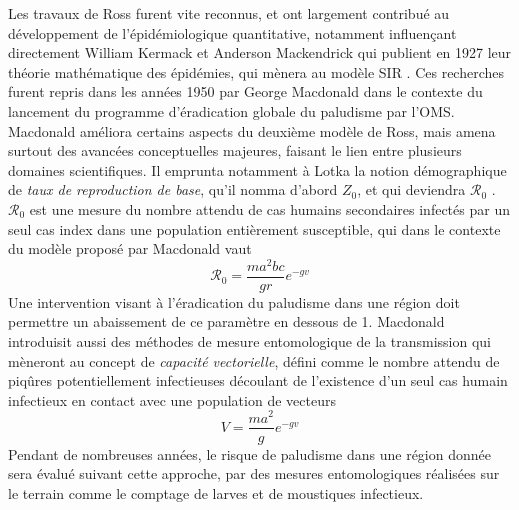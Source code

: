 Les travaux de Ross furent vite reconnus, et ont largement contribué au développement de l'épidémiologique quantitative, notamment influençant directement William Kermack et Anderson Mackendrick qui publient en 1927 leur théorie mathématique des épidémies, qui mènera au modèle SIR \cite{kermack1927contributions}.
Ces recherches furent repris dans les années 1950 par George Macdonald dans le contexte du lancement du programme d'éradication globale du paludisme par l'OMS.
Macdonald améliora certains aspects du deuxième modèle de Ross, mais amena surtout des avancées  conceptuelles majeures, faisant le lien entre plusieurs domaines scientifiques.
Il emprunta notamment à Lotka la notion démographique de {\em taux de reproduction de base}, qu'il nomma d'abord $Z_0$, et qui deviendra $\mathcal{R}_0$ \cite{macdonald1952analysis}. 
$\mathcal{R}_0$ est une mesure du nombre attendu de cas humains secondaires infectés par un seul cas index dans une population entièrement susceptible, qui dans le contexte du modèle proposé par Macdonald vaut
\begin{equation}
\mathcal{R}_0 = \frac{ma^2bc}{gr}e^{-gv}
\end{equation}
Une intervention visant à l'éradication du paludisme dans une région doit permettre un abaissement de ce paramètre en dessous de 1.
Macdonald introduisit aussi des méthodes de mesure entomologique de la transmission qui mèneront au concept de {\em capacité vectorielle}, défini comme le nombre attendu de piqûres potentiellement infectieuses découlant de l'existence d'un seul cas humain infectieux en contact avec une population de vecteurs 
\begin{equation}
V = \frac{ma^2}{g}e^{-gv}
\end{equation}
Pendant de nombreuses années, le risque de paludisme dans une région donnée sera évalué suivant cette approche, par des mesures entomologiques réalisées sur le terrain comme le comptage de larves et de moustiques infectieux.

